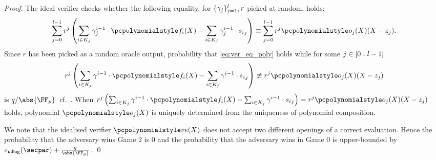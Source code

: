 \begin{proof}
  The ideal verifier checks whether the following equality, for $\{\gamma_j\}_{j = 1}^{l}, r$
  picked at random, holds:
  \begin{multline}
    \label{eq:ver_eq_poly}
    \sum_{j = 0}^{l - 1} r^{j}\left(\sum_{i \in K_j} \gamma_{j}^{i - 1} \cdot \p{f}_i(X) - \sum_{i \in K_j} \gamma_{j}^{i - 1} \cdot {s_i}_j \right) 
    \equiv \sum_{j = 0}^{l - 1} r^{j} \p{o_{j}}(X)(X - z_j).
  \end{multline}
  Since $r$ has been picked as a random oracle output, probability that
  \cref{eq:ver_eq_poly} holds while for some $j \in [0 \, .. \, l - 1]$
  \[
    r^j \left(\sum_{i \in K_j} \gamma^{i - 1} \cdot \p{f}_i(X) - \sum_{i \in K_j}
    \gamma^{i - 1} \cdot {s_i}_j \right) \not\equiv r^j \p{o_j}(X)(X - z_j)
  \]
  is $\infrac{q}{\abs{\FF_p}}$~cf.~\cite{EPRINT:GabWilCio19}. 
  When \(
    r^j \left(\sum_{i \in K_j} \gamma^{i - 1} \cdot \p{f}_i(X) - \sum_{i \in K_j}
    \gamma^{i - 1} \cdot {s_i}_j \right) = r^j \p{o_j}(X)(X - z_j)
  \)
  holds, polynomial $\p{o_j}(X)$ is uniquely determined from the uniqueness of
  polynomial composition. 

  We note that the idealised verifier $\vereq(X)$ does not accept two different openings of a correct evaluation. Hence the probability that the adversary wins Game 2 is $0$ and the probability that the adversary wins in Game 0 is upper-bounded by \(\epsudlog (\secpar) + \frac{q}{\abs{\FF_p}}\).
    \qed
\end{proof}

